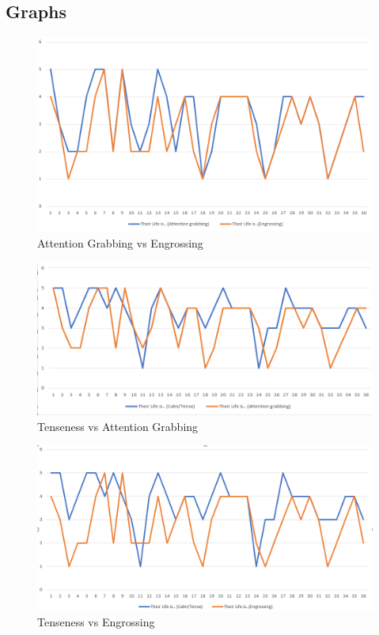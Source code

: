 \documentclass[11pt]{article}
\begin{document}
\subsection{Graphs}
\begin{figure}[h]
\caption{Attention Grabbing vs Engrossing}
\label{tab:AttentionGrabbingvsEngrossing}
 \centering
 \includegraphics[scale=0.75]{Attention Grabbing vs Engrossing.png}
\end{figure}


\begin{figure}[h]
\caption{Tenseness vs Attention Grabbing}
\label{tab:TensenessvsAttentionGrabbing}
 \centering
 \includegraphics[scale=0.75]{Tenseness vs Attention Grabbing.png}
\end{figure}

\pagebreak

\begin{figure}[h]
\caption{Tenseness vs Engrossing}
\label{tab:TensenessvsEngrossing}
 \centering
 \includegraphics[scale=0.75]{Tenseness vs Engrossing.png}
\end{figure}
\end{document}
